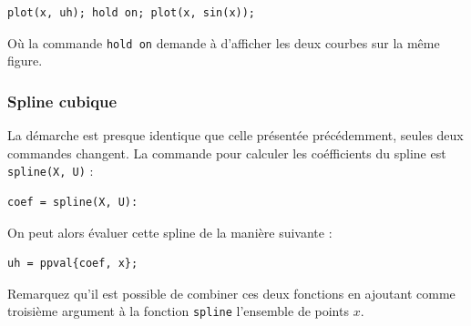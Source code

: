 \begin{lstlisting}
plot(x, uh); hold on; plot(x, sin(x));
\end{lstlisting}

Où la commande \lstinline{hold on} demande à \matlab{} d'afficher les deux courbes
sur la même figure.

\subsubsection{Spline cubique}
La démarche est presque identique que celle présentée précédemment, seules deux 
commandes changent. La commande pour calculer les coéfficients du spline
est \lstinline{spline(X, U)} :

\begin{lstlisting}
coef = spline(X, U):
\end{lstlisting}

On peut alors évaluer cette spline de la manière suivante :

\begin{lstlisting}
uh = ppval{coef, x}; 
\end{lstlisting}

Remarquez qu'il est possible de combiner ces deux fonctions en ajoutant comme
troisième argument à la fonction \lstinline{spline} l'ensemble de points $x$.
